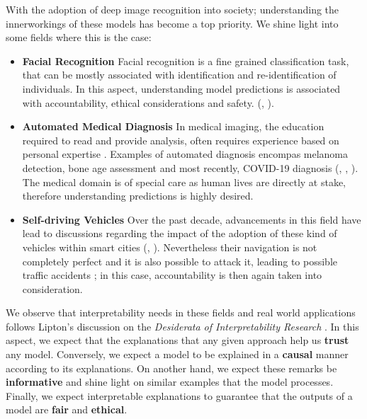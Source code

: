\noindent With the adoption of deep image recognition into society; understanding the 
innerworkings of these models has become a top priority. We shine light into some fields where 
this is the case:
\begin{itemize}
    \item \textbf{Facial Recognition} Facial recognition is a fine grained classification task, 
    that can be mostly associated with identification and re-identification of individuals. 
    In this aspect, understanding model predictions is associated with accountability, ethical 
    considerations and safety.
    (\cite{selinger2020inconsentability}, \cite{andrejevic2020facial}).
    \item \textbf{Automated Medical Diagnosis} In medical imaging, the education 
    required to read and provide analysis, often requires experience based 
    on personal expertise \autocite{nakashima2013visual}. Examples of automated diagnosis encompas 
    melanoma detection, bone age assessment and most recently, COVID-19 diagnosis (\cite{yu2016automated}, 
    \cite{BoNet2019hand}, \cite{huang2021artificial}). The medical domain is of special care 
    as human lives are directly at stake, therefore understanding predictions is highly desired.
    \item \textbf{Self-driving Vehicles} Over the past decade, advancements in this field have lead to 
    discussions regarding the impact of the adoption of these kind of vehicles within smart cities  
    (\cite{duarte2018impact}, \cite{millard2018pedestrians}). Nevertheless their 
    navigation is not completely perfect and it is also possible to attack it, leading to possible 
    traffic accidents \autocite{dixit2016autonomous}; in this case, accountability is then again 
    taken into consideration.
\end{itemize}

We observe that interpretability needs in these fields and real world applications follows 
Lipton's discussion on the \textit{Desiderata of Interpretability Research} 
\autocite{mythos_interp}. In this aspect, we expect that the explanations that any given 
approach help us \textbf{trust} any model. Conversely, we expect a model to be explained in a 
\textbf{causal} manner according to its explanations. On another hand, 
we expect these remarks be \textbf{informative} and shine light on similar examples that the 
model processes. Finally, we expect interpretable explanations to guarantee that the outputs 
of a model are \textbf{fair} and \textbf{ethical}.

